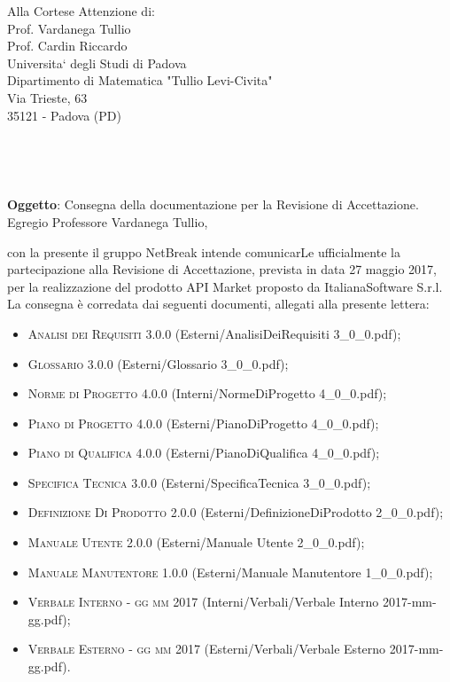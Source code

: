 \documentclass[11pt,a4paper]{letter}
\def\opening#1{\thispagestyle{empty}
{\centering\fromaddress \vspace{0.6in} \\ %
\hspace*{\longindentation}\hspace*{\fill}\par} %
{\raggedright \toname \\ \toaddress \par} %
\vspace{0.1in} %
\noindent #1 %
}
\begin{document}

\begin{letter}
{Alla Cortese Attenzione di:\\
	Prof. Vardanega Tullio\\
	Prof. Cardin Riccardo\\
	Universita` degli Studi di Padova\\
	Dipartimento di Matematica "Tullio Levi-Civita"\\
	Via Trieste, 63\\
	35121 - Padova (PD)\\
}


\opening{\textbf{Oggetto}: Consegna della documentazione per la Revisione di Accettazione.}\\

\noindent Egregio Professore Vardanega Tullio,

\indent con la presente il gruppo NetBreak intende comunicarLe ufficialmente la partecipazione alla Revisione di Accettazione, prevista in data 27 maggio 2017, per la realizzazione del prodotto API Market proposto da ItalianaSoftware S.r.l.\\
La consegna \`e corredata dai seguenti documenti, allegati alla presente lettera:

\begin{itemize}
	\item \textsc{Analisi dei Requisiti 3.0.0} (Esterni/AnalisiDeiRequisiti 3\_0\_0.pdf); 
	\item \textsc{Glossario 3.0.0} (Esterni/Glossario 3\_0\_0.pdf); 
	\item \textsc{Norme di Progetto 4.0.0} (Interni/NormeDiProgetto 4\_0\_0.pdf); 
	\item \textsc{Piano di Progetto 4.0.0} (Esterni/PianoDiProgetto 4\_0\_0.pdf); 
	\item \textsc{Piano di Qualifica 4.0.0} (Esterni/PianoDiQualifica 4\_0\_0.pdf); 
	\item \textsc{Specifica Tecnica 3.0.0} (Esterni/SpecificaTecnica 3\_0\_0.pdf);
	\item \textsc{Definizione Di Prodotto 2.0.0} (Esterni/DefinizioneDiProdotto 2\_0\_0.pdf);
	\item \textsc{Manuale Utente 2.0.0} (Esterni/Manuale Utente 2\_0\_0.pdf);
	\item \textsc{Manuale Manutentore 1.0.0} (Esterni/Manuale Manutentore 1\_0\_0.pdf);
	\item \textsc{Verbale Interno - gg mm 2017} (Interni/Verbali/Verbale Interno 2017-mm-gg.pdf);
	\item \textsc{Verbale Esterno - gg mm 2017} (Esterni/Verbali/Verbale Esterno 2017-mm-gg.pdf). 
\end{itemize}


\end{letter}
\end{document}
